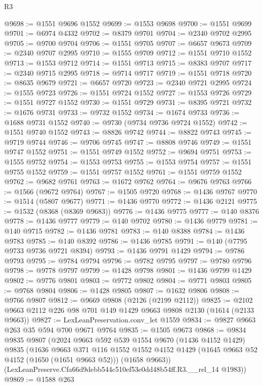 \begin{lexlean}{R3}
\begin{coremodule}
@9698 := @1551 @9696 @1552
@9699 := @1553 @9698
@9700 := @1551 @9699
@9701 := @6974 @4332
@9702 := @8379 @9701
@9704 := @2340 @9702 @2995
@9705 := @9700 @9704
@9706 := @1551 @9705
@9707 := @6657 @9673
@9709 := @2340 @9707 @2995
@9710 := @1555 @9709
@9712 := @1551 @9710 @1552
@9713 := @1553 @9712
@9714 := @1551 @9713
@9715 := @8383 @9707
@9717 := @2340 @9715 @2995
@9718 := @9714 @9717
@9719 := @1551 @9718
@9720 := @8635 @9679
@9721 := @6657 @9720
@9723 := @2340 @9721 @2995
@9724 := @1555 @9723
@9726 := @1551 @9724 @1552
@9727 := @1553 @9726
@9729 := @1551 @9727 @1552
@9730 := @1551 @9729
@9731 := @8395 @9721
@9732 := @1676 @9731
@9733 := @9732 @1552
@9734 := @1674 @9733
@9736 := @1688 @9731 @1552
@9740 := @9730 (@9734 @9736 @9724 @1552)
@9742 := @1551 @9740 @1552
@9743 := @8826 @9742
@9744 := @8822 @9743
@9745 := @9719 @9744
@9746 := @9706 @9745
@9747 := @8808 @9746
@9749 := @1551 @9747 @1552
@9751 := @1551 @9749 @1552
@9752 := @9694 @9751
@9753 := @1555 @9752
@9754 := @1553 @9753
@9755 := @1553 @9754
@9757 := @1551 @9755 @1552
@9759 := @1551 @9757 @1552
@9761 := @1551 @9759 @1552
@9762 := @9682 @9761
@9763 := @1672 @9762
@9764 := @9676 @9763
@9766 := @1566 (@9672 @9764)
@9767 := @1505 @9720
@9768 := @1436 @9767
@9770 := @1514 (@5807 @9677)
@9771 := @1436 @9770
@9772 := @1436 @2121
@9775 := @1532 (@8368 (@8369 @9683))
@9776 := @1436 @9775
@9777 := @140 @8376
@9778 := @1436 @9777
@9779 := @140 @9702
@9780 := @1436 @9779
@9781 := @140 @9715
@9782 := @1436 @9781
@9783 := @140 @8388
@9784 := @1436 @9783
@9785 := @140 @8392
@9786 := @1436 @9785
@9791 := @140 (@7795 @9733 @9736 @9721 @8394)
@9793 := @1436 @9791 @1429
@9794 := @9786 @9793
@9795 := @9784 @9794
@9796 := @9782 @9795
@9797 := @9780 @9796
@9798 := @9778 @9797
@9799 := @1428 @9798
@9801 := @1436 @9799 @1429
@9802 := @9776 @9801
@9803 := @9772 @9802
@9804 := @9771 @9803
@9805 := @9768 @9804
@9806 := @1428 @9805
@9807 := @1632 @9806
@9808 := @9766 @9807
@9812 := @9669 @9808 (@2126 (@2199 @2112))
@9825 := @2102 @9663 @2112 @226 @98 @701 @149 @1429 @9663 @9808 @2130 (@1614 (@2133 @9663))
@9827 := LexLeanPreservation.conv_let @1559
@9834 := @9827 @9663 @263 @35 @594 @700 @9671 @9764
@9835 := @1505 @9673
@9868 := @9834
    @9835
    @9807
    (@2024
      @9663
      @592
      @539
      @1554
      @9670
      (@1436 @4152 @1429)
      @9835
      (@1636
        @9663
        @371
        @116
        @1552
        @1552
        @4152
        @1429
        (@1645 @9663 @52 @4152 (@1650 (@1651 @9663 @52)))
        (@1658 @9663))
      (LexLeanPreserve.Cfa66d9debb544c510ef53e0dd48b54ff.R3.__rel_14 @1983))
@9869 := @1588 @263

\end{coremodule}
\end{lexlean}
